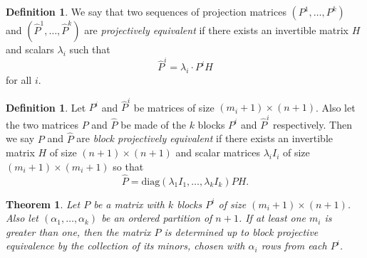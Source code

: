 \documentclass[a4paper]{article}
\theoremstyle{plain}
\newtheorem{thm}[equation]{Theorem}
\theoremstyle{definition}
\newtheorem{defi}[equation]{Definition}
\begin{document}
\begin{defi}
	We say that two sequences of projection matrices \( (P^1, \ldots, P^k) \) and
	\( (\hat{P}^1, \ldots, \hat{P}^k) \) are \emph{projectively equivalent} if there
	exists an invertible matrix \( H \) and scalars \( \lambda_i \) such that
	\[
		\hat{P}^i = \lambda_i \cdot P^i H
	\]
	for all \( i \).
\end{defi}

\begin{defi}
	Let \( P^i \) and \( \hat{P}^i \) be matrices of size \( (m_i + 1) \times (n+1) \).
	Also let the two matrices \( P \) and \( \hat{P} \) be made of the \( k \) blocks \( P^i \)
	and \( \hat{P}^i \) respectively. Then we say \( P \) and \( \hat{P} \) are
	\emph{block projectively equivalent} if there exists an invertible matrix \( H \) of size
	\( (n+1) \times (n+1) \) and scalar matrices \( \lambda_i I_i \) of size
	\( (m_i + 1) \times (m_i + 1) \) so that
	\[
		\hat{P} = \text{diag}(\lambda_1 I_1, \ldots, \lambda_k I_k) P H.
	\]
\end{defi}

\begin{thm}
	Let \( P \) be a matrix with \( k \) blocks \( P^i \) of size \( (m_i+1) \times (n+1) \).
	Also let \( (\alpha_1, \ldots, \alpha_k) \) be an ordered partition of \( n+1 \).
	If at least one \( m_i \) is greater than one, then the matrix \( P \) is determined
	up to block projective equivalence by the collection of its minors, chosen with
	\( \alpha_i \) rows from each \( P^i \).
\end{thm}
\end{document}
